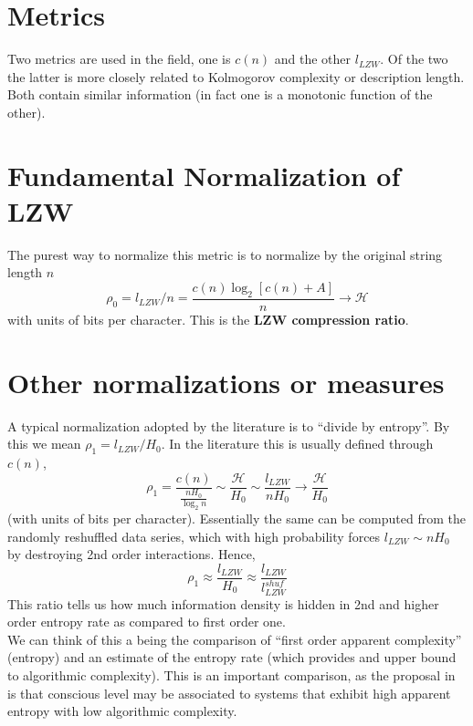 \documentclass[11pt]{amsart}
\begin{document}
\section{Metrics}

Two metrics are used in the field, one is $c(n)$ and the other $l_{LZW}$. Of the two the latter is more closely related to Kolmogorov complexity or description length. Both contain similar information (in fact one is a monotonic function of the other). 



\section{Fundamental Normalization of LZW}

The purest way to normalize this metric is to normalize  by the original string length $n$
$$
\rho_{0} = l_{LZW} / n = \frac{c(n) \log_{2} [ c(n) +A] } {n} \rightarrow  \mathcal H
$$
with units of bits per character. This is the  {\bf  LZW compression ratio}.

\section{Other normalizations or measures}

A typical normalization adopted by  the literature is to ``divide by entropy''. By this we mean $\rho_{1}= l_{LZW} / H_{0}$. In the literature this is usually defined through $c(n)$, 
$$
\rho_{1} = \frac{c(n)}{\frac{n  H_{0}}{\log_{2} n } } \sim \frac{\mathcal H}{H_{0}} \sim \frac{l_{LZW} }{nH_{0}} \rightarrow \frac{\mathcal H}{H_{0}}
$$
(with units of bits per character).
Essentially the same can be computed from the randomly reshuffled data series, which with high probability forces $l_{LZW} \sim n H_{0}$ by destroying 2nd order interactions.
Hence,
$$
\rho_{1} \approx  \frac{l_{LZW}} { H_{0}} \approx \frac{l_{LZW} }{l^{shuf}_{LZW}} 
$$
This ratio tells us how much information density is hidden in 2nd and higher order entropy rate as compared to first order one. \\

We can think of this a being the comparison of ``first order apparent complexity'' (entropy) and an estimate of the entropy rate (which provides and upper bound to algorithmic complexity). This is an important comparison, as the proposal in \cite{Ruffini:2016ac} is that conscious level may be associated to systems that exhibit high apparent entropy with low algorithmic complexity. 
\end{document}
